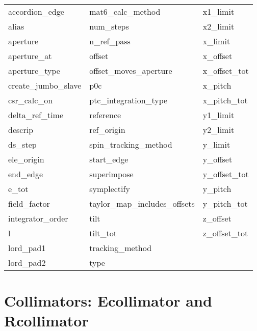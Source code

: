  \begin{tabular}{lll} \toprule
accordion_edge              & mat6_calc_method            & x1_limit                    \\
alias                       & num_steps                   & x2_limit                    \\
aperture                    & n_ref_pass                  & x_limit                     \\
aperture_at                 & offset                      & x_offset                    \\
aperture_type               & offset_moves_aperture       & x_offset_tot                \\
create_jumbo_slave          & p0c                         & x_pitch                     \\
csr_calc_on                 & ptc_integration_type        & x_pitch_tot                 \\
delta_ref_time              & reference                   & y1_limit                    \\
descrip                     & ref_origin                  & y2_limit                    \\
ds_step                     & spin_tracking_method        & y_limit                     \\
ele_origin                  & start_edge                  & y_offset                    \\
end_edge                    & superimpose                 & y_offset_tot                \\
e_tot                       & symplectify                 & y_pitch                     \\
field_factor                & taylor_map_includes_offsets & y_pitch_tot                 \\
integrator_order            & tilt                        & z_offset                    \\
l                           & tilt_tot                    & z_offset_tot                \\
lord_pad1                   & tracking_method             &                             \\
lord_pad2                   & type                        &                             \\
 \bottomrule
 \end{tabular}
 \vfill
 
 \section{Collimators: Ecollimator and Rcollimator}
 \label{s:list.collimator}
 
